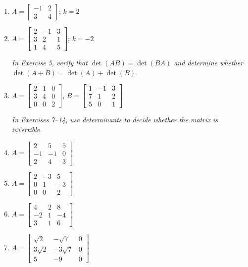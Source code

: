 \documentclass{article}
\theoremstyle{mystyle}
\begin{document}
\begin{enumerate}

\item[1.] $A=\begin{bmatrix}-1&2\\3&4\end{bmatrix}$;\; $k=2$

\item[3.] $A=\begin{bmatrix}2&-1&3\\3&2&1\\1&4&5\end{bmatrix}$;\; $k=-2$

\noindent\textit{In Exercise 5, verify that $\det(AB)=\det(BA)$ and determine whether
$\det(A+B)=\det(A)+\det(B)$.}

\item[5.] $A=\begin{bmatrix}2&1&0\\3&4&0\\0&0&2\end{bmatrix}$,\quad
$B=\begin{bmatrix}1&-1&3\\7&1&2\\5&0&1\end{bmatrix}$

\noindent\textit{In Exercises 7--14, use determinants to decide whether the matrix is
invertible.}

\item[7.] $A=\begin{bmatrix}2&5&5\\-1&-1&0\\2&4&3\end{bmatrix}$

\item[9.] $A=\begin{bmatrix}2&-3&5\\0&1&-3\\0&0&2\end{bmatrix}$

\item[11.] $A=\begin{bmatrix}4&2&8\\-2&1&-4\\3&1&6\end{bmatrix}$

\item[14.] $A=\begin{bmatrix}\sqrt{2}&-\sqrt{7}&0\\3\sqrt{2}&-3\sqrt{7}&0\\5&-9&0\end{bmatrix}$


\end{enumerate}
\end{document}
